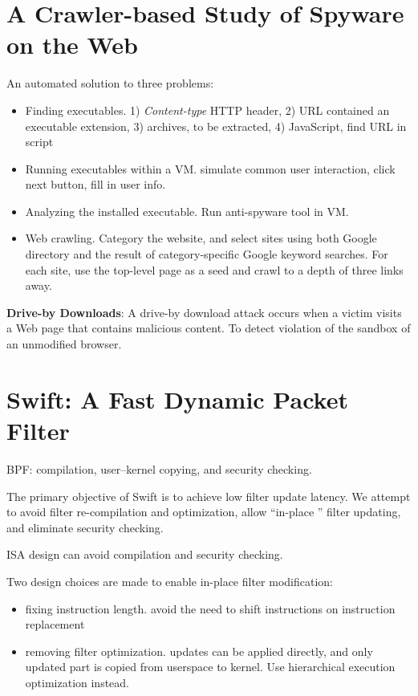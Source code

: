 \documentclass[]{article}
\begin{document}
\section{A Crawler-based Study of Spyware on the Web}
An automated solution to three problems:
\begin{itemize}
 \item Finding executables. 1) \textit{Content-type} HTTP header,
 2) URL contained an executable extension, 3) archives, to be extracted,
 4) JavaScript, find URL in script
 \item Running executables within a VM. simulate common user interaction,
 click next button, fill in user info.
 \item Analyzing the installed executable. Run anti-spyware tool in VM.
 \item Web crawling. Category the website, and select sites using both
 Google directory and the result of category-specific Google keyword
 searches. For each site, use the top-level page as a seed and crawl
 to a depth of three links away.
\end{itemize}

\textbf{Drive-by Downloads}: A drive-by download attack occurs 
when a victim visits a Web page that contains malicious content. 
To detect violation of the sandbox of an unmodified browser.

\section{Swift: A Fast Dynamic Packet Filter}
BPF: compilation, user–kernel copying, and security checking.

The primary objective of Swift is to achieve low filter update latency.
We attempt to avoid filter re-compilation and optimization, allow 
``in-place ” filter updating, and eliminate security checking.

ISA design can avoid compilation and security checking.

Two design choices are made to enable in-place filter modification: 
\begin{itemize}
 \item fixing instruction length. avoid the need to shift instructions
 on instruction replacement
 \item removing filter optimization. updates can be applied directly,
 and only updated part is copied from userspace to kernel. Use 
 hierarchical execution optimization instead.
\end{itemize}
\end{document}
